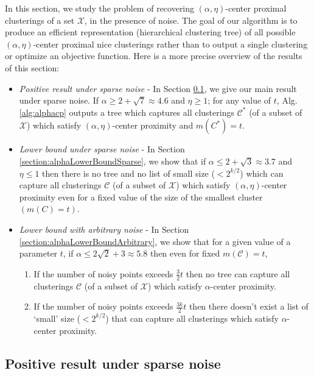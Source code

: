 \documentclass[orivec]{llncs}
\newcommand{\mc}{\mathcal}
\begin{document}
In this section, we study the problem of recovering $(\alpha, \eta)$-center proximal clusterings of a set $\mc X$, in the presence of noise. The goal of our algorithm is to produce an efficient representation (hierarchical clustering tree) of all possible $(\alpha, \eta)$-center proximal nice clusterings rather than to output a single clustering or optimize an objective function. Here is a more precise overview of the results of this section: 
\begin{itemize}[nolistsep,noitemsep,leftmargin=*]
\item  {\it Positive result under sparse noise} - In Section \ref{section:positiveResultSparseNoise}, we give our main result under sparse noise. If $\alpha \ge 2 + \sqrt{7} \approx 4.6$ and $\eta \ge 1$; for any value of $t$, Alg.\ref{alg:alphacp} outputs a tree which captures all clusterings $\mc C^*$ (of a subset of $\mc X$) which satisfy $(\alpha, \eta)$-center proximity and $m(C^*)=t$.
\item  {\it Lower bound under sparse noise} - In Section \ref{section:alphaLowerBoundSparse}, we show that if $\alpha \le 2 + \sqrt{3} \approx 3.7$ and $\eta \le 1$ then there is no tree and no list of small size ($< 2^{k/2}$) which can capture all clusterings $\mc C$ (of a subset of $\mc X$) which satisfy $(\alpha, \eta)$-center proximity even for a fixed value of the size of the smallest cluster $(m(C) = t)$.
\item {\it Lower bound with arbitrary noise} - In Section \ref{section:alphaLowerBoundArbitrary}, we show that for a given value of a parameter $t$, if $\alpha \le 2\sqrt{2} + 3 \approx 5.8$ then even for fixed $m(\mc C) = t$,
\begin{enumerate}
\item If the number of noisy points exceeds $\frac{3}{2}t$ then no tree can capture all clusterings $\mc C$ (of a subset of $\mc X$) which satisfy $\alpha$-center proximity.
\item If the number of noisy points exceeds $\frac{3k}{2}t$ then there doesn't exist a list of `small' size ($<2^{k/2}$) that can capture all clusterings which satisfy $\alpha$-center proximity.
\end{enumerate}
\end{itemize} 

\subsection{Positive result under sparse noise}
\label{section:positiveResultSparseNoise}
\end{document}
